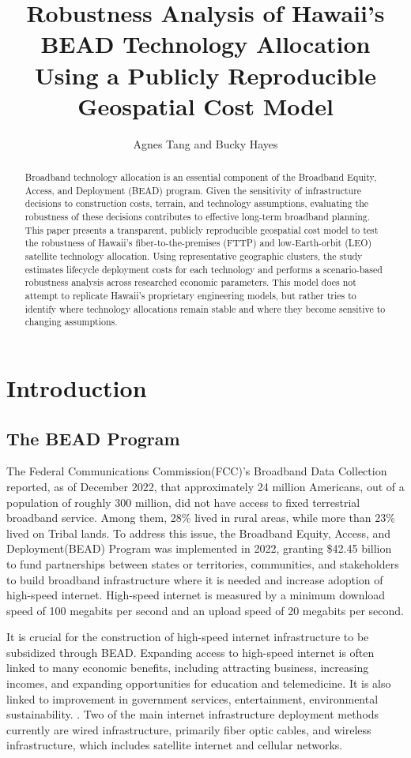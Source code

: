 \documentclass[conference]{IEEEtran}
\title{Robustness Analysis of Hawaii's BEAD Technology Allocation Using a Publicly Reproducible Geospatial Cost Model}
\author{Agnes Tang and Bucky Hayes}
\begin{document}
\maketitle

\begin{abstract}
Broadband technology allocation is an essential component of the Broadband Equity, Access, and Deployment (BEAD) program. Given the sensitivity of infrastructure decisions to construction costs, terrain, and technology assumptions, evaluating the robustness of these decisions contributes to effective long-term broadband planning. This paper presents a transparent, publicly reproducible geospatial cost model to test the robustness of Hawaii's fiber-to-the-premises (FTTP) and low-Earth-orbit (LEO) satellite technology allocation. Using representative geographic clusters, the study estimates lifecycle deployment costs for each technology and performs a scenario-based robustness analysis across researched economic parameters. This model does not attempt to replicate Hawaii's proprietary engineering models, but rather tries to identify where technology allocations remain stable and where they become sensitive to changing assumptions. 
\end{abstract}

\section{Introduction}
\subsection{The BEAD Program}
The Federal Communications Commission(FCC)'s Broadband Data Collection reported, as of December 2022, that approximately 24 million Americans, out of a population of roughly 300 million, did not have access to fixed terrestrial broadband service. Among them, 28\% lived in rural areas, while more than 23\% lived on Tribal lands. To address this issue, the Broadband Equity, Access, and Deployment(BEAD) Program was implemented in 2022, granting \$42.45 billion to fund partnerships between states or territories, communities, and stakeholders to build broadband infrastructure where it is needed and increase adoption of high-speed internet. High-speed internet is measured by a minimum download speed of 100 megabits per second and an upload speed of 20 megabits per second.

It is crucial for the construction of high-speed internet infrastructure to be subsidized through BEAD. Expanding access to high-speed internet is often linked to many economic benefits, including attracting business, increasing incomes, and expanding opportunities for education and telemedicine. It is also linked to improvement in government services, entertainment, environmental sustainability. \cite{MOST2022broadband}.
Two of the main internet infrastructure deployment methods currently are wired infrastructure, primarily fiber optic cables, and wireless infrastructure, which includes satellite internet and cellular networks.
\end{document}
